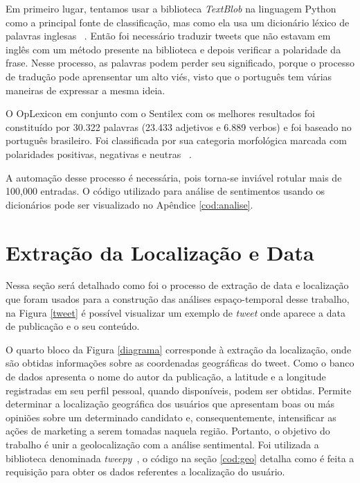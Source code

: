 Em primeiro lugar, tentamos usar a biblioteca \textit{TextBlob} na
linguagem Python como a principal fonte de classificação,
mas como ela usa um dicionário léxico de palavras inglesas
~\cite{miller1995wordnet}. Então foi necessário traduzir tweets que não estavam em
inglês com um método presente na biblioteca e depois verificar
a polaridade da frase. Nesse processo, as palavras podem
perder seu significado, porque o processo de tradução pode
aprensentar um alto viés, visto que o português tem várias maneiras de expressar a mesma ideia.


O OpLexicon em conjunto com o Sentilex com os melhores resultados foi constituído
por 30.322 palavras (23.433 adjetivos e 6.889 verbos) e foi
baseado no português brasileiro. Foi classificada por sua
categoria morfológica marcada com polaridades positivas,
negativas e neutras ~\cite{souza2011construction}.


A automação desse processo é necessária, pois torna-se inviável rotular mais de 100,000 entradas. 
O código utilizado para análise de sentimentos usando os dicionários pode ser visualizado no Apêndice
\ref{cod:analise}.


\section{Extração da Localização e Data}
\label{extract_timestamp}

Nessa seção será detalhado como foi o processo de extração de data e localização que foram usados para a construção das análises espaço-temporal
desse trabalho, na Figura \ref{tweet} é possível visualizar um exemplo de \textit{tweet} onde aparece a data de publicação e o seu conteúdo. 





O quarto bloco da Figura \ref{diagrama} corresponde à extração da
localização, onde são obtidas informações sobre as coordenadas
geográficas do tweet. Como o banco de dados apresenta
o nome do autor da publicação, a latitude e a longitude
registradas em seu perfil pessoal, quando disponíveis, podem
ser obtidas. Permite determinar a localização geográfica dos
usuários que apresentam boas ou más opiniões sobre um
determinado candidato e, consequentemente, intensificar as
ações de marketing a serem tomadas naquela região. Portanto,
o objetivo do trabalho é unir a geolocalização com a análise
sentimental. Foi utilizada a biblioteca denominada \textit{tweepy}~\cite{roesslein2009tweepy}, o código na seção \ref{cod:geo} detalha como é feita a requisição 
para obter os dados referentes a localização do usuário.



